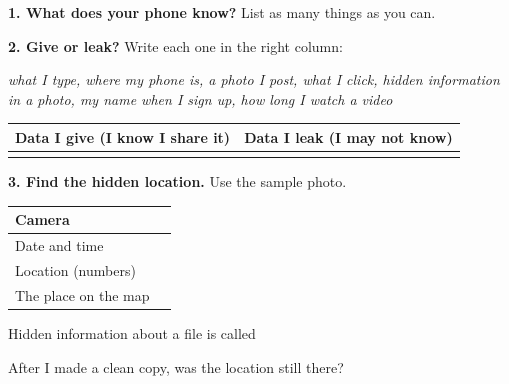 \documentclass[11pt]{article}
\begin{document}
\partner

\vspace{0.4em}
{\large\textbf{1. What does your phone know?}} List as many things as you can.

\vspace{0.6em}

\vspace{0.6em}
\blank{6.9in}

\vspace{1.0em}
{\large\textbf{2. Give or leak?}} Write each one in the right column:

\vspace{0.3em}
\textit{what I type, where my phone is, a photo I post, what I click, hidden information in a photo, my name when I sign up, how long I watch a video}

\vspace{0.4em}
\begin{tabular}{|R{3.25in}|R{3.25in}|}
\hline
\textbf{Data I give} (I know I share it) & \textbf{Data I leak} (I may not know) \\ \hline
{} &  \\[3.0em] \hline
\end{tabular}

\vspace{1.0em}
{\large\textbf{3. Find the hidden location.}} Use the sample photo.

\vspace{0.3em}
\begin{tabular}{|R{1.8in}|R{4.7in}|}
\hline
Camera &  \\[0.3em] \hline
Date and time &  \\[0.3em] \hline
Location (numbers) &  \\[0.3em] \hline
The place on the map &  \\[0.3em] \hline
\end{tabular}

\vspace{0.7em}
Hidden information about a file is called 

\vspace{0.6em}
After I made a clean copy, was the location still there? 
\end{document}
